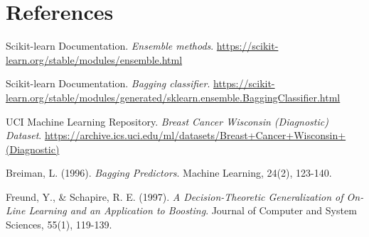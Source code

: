 \documentclass[12pt,a4paper]{article}
\begin{document}
\section{References}
\begin{enumerate}[label={[\arabic*]}]
    \item Scikit-learn Documentation. \textit{Ensemble methods}. \url{https://scikit-learn.org/stable/modules/ensemble.html}
    \item Scikit-learn Documentation. \textit{Bagging classifier}. \url{https://scikit-learn.org/stable/modules/generated/sklearn.ensemble.BaggingClassifier.html}
    \item UCI Machine Learning Repository. \textit{Breast Cancer Wisconsin (Diagnostic) Dataset}. \url{https://archive.ics.uci.edu/ml/datasets/Breast+Cancer+Wisconsin+(Diagnostic)}
    \item Breiman, L. (1996). \textit{Bagging Predictors}. Machine Learning, 24(2), 123-140.
    \item Freund, Y., \& Schapire, R. E. (1997). \textit{A Decision-Theoretic Generalization of On-Line Learning and an Application to Boosting}. Journal of Computer and System Sciences, 55(1), 119-139.
\end{enumerate}
\end{document}
